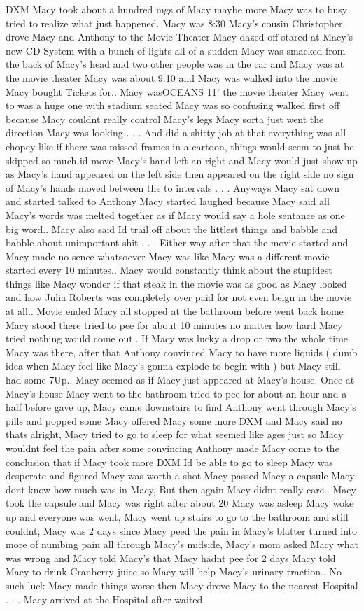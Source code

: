 \documentclass[12pt]{book}
\begin{document}
DXM Macy took about a hundred mgs of Macy maybe more Macy was to busy tried to realize what just happened. Macy was 8:30 Macy's cousin Christopher drove Macy and Anthony to the Movie Theater Macy dazed off stared at Macy's new CD System with a bunch of lights all of a sudden Macy was smacked from the back of Macy's head and two other people was in the car and Macy was at the movie theater Macy was about 9:10 and Macy was walked into the movie Macy bought Tickets for.. Macy wasOCEANS 11' the movie theater Macy went to was a huge one with stadium seated Macy was so confusing walked first off because Macy couldnt really control Macy's legs Macy sorta just went the direction Macy was looking . . .  And did a shitty job at that everything was all chopey like if there was missed frames in a cartoon, things would seem to just be skipped so much id move Macy's hand left an right and Macy would just show up as Macy's hand appeared on the left side then appeared on the right side no sign of Macy's hands moved between the to intervals . . .  Anyways Macy sat down and started talked to Anthony Macy started laughed because Macy said all Macy's words was melted together as if Macy would say a hole sentance as one big word.. Macy also said Id trail off about the littlest things and babble and babble about unimportant shit . . .  Either way after that the movie started and Macy made no sence whatsoever Macy was like Macy was a different movie started every 10 minutes.. Macy would constantly think about the stupidest things like Macy wonder if that steak in the movie was as good as Macy looked and how Julia Roberts was completely over paid for not even beign in the movie at all.. Movie ended Macy all stopped at the bathroom before went back home Macy stood there tried to pee for about 10 minutes no matter how hard Macy tried nothing would come out.. If Macy was lucky a drop or two the whole time Macy was there, after that Anthony convinced Macy to have more liquids ( dumb idea when Macy feel like Macy's gonna explode to begin with ) but Macy still had some 7Up.. Macy seemed as if Macy just appeared at Macy's house. Once at Macy's house Macy went to the bathroom tried to pee for about an hour and a half before gave up, Macy came downstairs to find Anthony went through Macy's pills and popped some Macy offered Macy some more DXM and Macy said no thats alright, Macy tried to go to sleep for what seemed like ages just so Macy wouldnt feel the pain after some convincing Anthony made Macy come to the conclusion that if Macy took more DXM Id be able to go to sleep Macy was desperate and figured Macy was worth a shot Macy passed Macy a capsule Macy dont know how much was in Macy, But then again Macy didnt really care.. Macy took the capsule and Macy was right after about 20 Macy was asleep Macy woke up and everyone was went, Macy went up stairs to go to the bathroom and still couldnt, Macy was 2 days since Macy peed the pain in Macy's blatter turned into more of numbing pain all through Macy's midside, Macy's mom asked Macy what was wrong and Macy told Macy's that Macy hadnt pee for 2 days Macy told Macy to drink Cranberry juice so Macy will help Macy's urinary traction.. No such luck Macy made things worse then Macy drove Macy to the nearest Hospital . . .  Macy arrived at the Hospital after waited 
\end{document}
